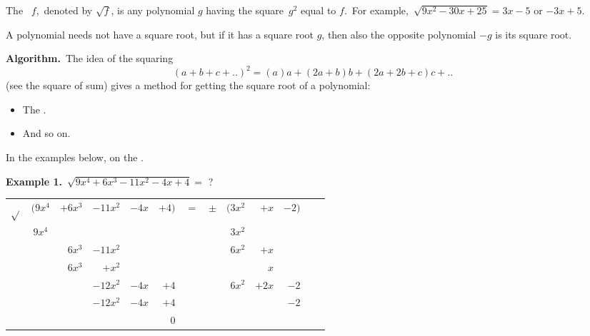 \documentclass[12pt]{article}
\theoremstyle{definition}
\begin{document}
The \, $f$,\, denoted by $\sqrt{f}$, is any polynomial $g$ having the square\, $g^2$ equal to $f$.\, For example,\, $\sqrt{9x^2\!-\!30x\!+\!25} = 3x\!-\!5$ or $-3x\!+\!5$.

A polynomial needs not have a square root, but if it has a square root $g$, then also the opposite polynomial $-g$ is its square root.

\textbf{Algorithm.}\, The idea of the squaring 
$$(a\!+\!b\!+\!c+..)^2 =(a)a+(2a\!+\!b)b+(2a\!+\!2b\!+\!c)c+..$$
(see the square of sum) gives a method for getting the square root of a polynomial:
\begin{itemize}
 \item The . 
 \item And so on.
\end{itemize}

In the examples below, on the .

\textbf{Example 1.}\, $\sqrt{9x^4\!+\!6x^3\!-\!11x^2\!-\!4x\!+\!4} =$ ? 

\begin{tabular}{lcrrrrrrrrrrr}
$\sqrt{}
$&$(9x^4$&$+6x^3$&$-11x^2$&$-4x$&$+4)$&$=$&$\pm$&$(3x^2$&$ +x$&$-2)$\\
$       $&$ 9x^4$&$     $&$      $&$   $&$   $&$ $&$   $&$ 3x^2$&$   $&$   $\\
\cline{2-2} \cline{9-9}
$       $&$     $&$ 6x^3$&$-11x^2$&$   $&$   $&$ $&$   $&$ 6x^2$&$  +x$&$  $\\
$       $&$     $&$ 6x^3$&$  +x^2$&$   $&$   $&$ $&$   $&$     $&$   x$&$  $\\
\cline{3-4} \cline{9-10}
$       $&$     $&$     $&$-12x^2$&$-4x$&$ +4$&$ $&$   $&$ 6x^2$&$ +2x$&$-2$\\
$       $&$     $&$     $&$-12x^2$&$-4x$&$ +4$&$ $&$   $&$     $&$    $&$-2$\\
\cline{4-6} \cline{9-11}
$       $&$     $&$     $&$      $&$   $&$ 0$&$  $&$   $&$     $&$    $&$   $\\
\end{tabular}
\end{document}
